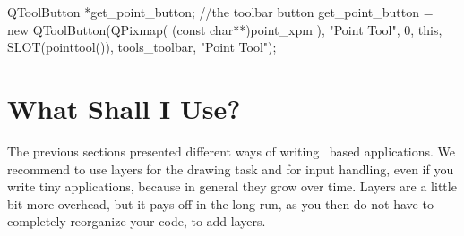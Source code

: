 \ccExample
\begin{ccExampleCode}
    QToolButton *get_point_button; //the toolbar button
    get_point_button =  new QToolButton(QPixmap( (const char**)point_xpm ),
                                     "Point Tool", 
                                     0, 
                                     this, 
                                     SLOT(pointtool()), 
                                     tools_toolbar, 
                                     "Point Tool");
\end{ccExampleCode}



\section{What Shall I Use?}

The previous sections presented different ways of writing \qt\ based 
applications. We recommend to use layers for the drawing task and for
input handling, even if you write tiny applications, because in general
they grow over time. Layers are a little bit more overhead, but 
it pays off in the long run, as you then do not have to completely
reorganize your code, to add layers. 








